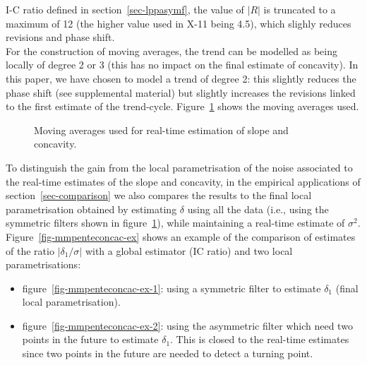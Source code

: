 \documentclass[
]{article}
\newcommand\1{\mathds{1}}
\begin{document}
\begin{itemize}
  I-C ratio defined in section~\ref{sec-lppasymf}, the value of \(|R|\)
  is truncated to a maximum of 12 (the higher value used in X-11 being
  4.5), which slighly reduces revisions and phase shift.\\
  For the construction of moving averages, the trend can be modelled as
  being locally of degree 2 or 3 (this has no impact on the final
  estimate of concavity). In this paper, we have chosen to model a trend
  of degree 2: this slightly reduces the phase shift (see supplemental
  material) but slightly increases the revisions linked to the first
  estimate of the trend-cycle. Figure~\ref{fig-mmpenteconcac} shows the
  moving averages used.
\end{itemize}

\begin{figure}[H]

\caption{\label{fig-mmpenteconcac}Moving averages used for real-time
estimation of slope and concavity.}


\end{figure}%

To distinguish the gain from the local parametrisation of the noise
associated to the real-time estimates of the slope and concavity, in the
empirical applications of section~\ref{sec-comparison} we also compares
the results to the final local parametrisation obtained by estimating
\(\delta\) using all the data (i.e., using the symmetric filters shown
in figure~\ref{fig-mmpenteconcac}), while maintaining a real-time
estimate of \(\sigma^2\). Figure~\ref{fig-mmpenteconcac-ex} shows an
example of the comparison of estimates of the ratio
\(|\delta_1/\sigma|\) with a global estimator (IC ratio) and two local
parametrisations:

\begin{itemize}
\item
  figure~\ref{fig-mmpenteconcac-ex-1}: using a symmetric filter to
  estimate \(\delta_1\) (final local parametrisation).
\item
  figure~\ref{fig-mmpenteconcac-ex-2}: using the asymmetric filter which
  need two points in the future to estimate \(\delta_1\). This is closed
  to the real-time estimates since two points in the future are needed
  to detect a turning point.
\end{itemize}
\end{document}
